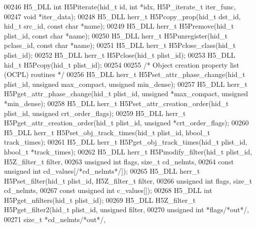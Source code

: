 \begin{DoxyCode}
00246 H5\_DLL \textcolor{keywordtype}{int} H5Piterate(hid\_t \textcolor{keywordtype}{id}, \textcolor{keywordtype}{int} *idx, H5P\_iterate\_t iter\_func,
00247             \textcolor{keywordtype}{void} *iter\_data);
00248 H5\_DLL herr\_t H5Pcopy\_prop(hid\_t dst\_id, hid\_t src\_id, \textcolor{keyword}{const} \textcolor{keywordtype}{char} *name);
00249 H5\_DLL herr\_t H5Premove(hid\_t plist\_id, \textcolor{keyword}{const} \textcolor{keywordtype}{char} *name);
00250 H5\_DLL herr\_t H5Punregister(hid\_t pclass\_id, \textcolor{keyword}{const} \textcolor{keywordtype}{char} *name);
00251 H5\_DLL herr\_t H5Pclose\_class(hid\_t plist\_id);
00252 H5\_DLL herr\_t H5Pclose(hid\_t plist\_id);
00253 H5\_DLL hid\_t H5Pcopy(hid\_t plist\_id);
00254 
00255 \textcolor{comment}{/* Object creation property list (OCPL) routines */}
00256 H5\_DLL herr\_t H5Pset\_attr\_phase\_change(hid\_t plist\_id, \textcolor{keywordtype}{unsigned} max\_compact, \textcolor{keywordtype}{unsigned} min\_dense);
00257 H5\_DLL herr\_t H5Pget\_attr\_phase\_change(hid\_t plist\_id, \textcolor{keywordtype}{unsigned} *max\_compact, \textcolor{keywordtype}{unsigned} *min\_dense);
00258 H5\_DLL herr\_t H5Pset\_attr\_creation\_order(hid\_t plist\_id, \textcolor{keywordtype}{unsigned} crt\_order\_flags);
00259 H5\_DLL herr\_t H5Pget\_attr\_creation\_order(hid\_t plist\_id, \textcolor{keywordtype}{unsigned} *crt\_order\_flags);
00260 H5\_DLL herr\_t H5Pset\_obj\_track\_times(hid\_t plist\_id, hbool\_t track\_times);
00261 H5\_DLL herr\_t H5Pget\_obj\_track\_times(hid\_t plist\_id, hbool\_t *track\_times);
00262 H5\_DLL herr\_t H5Pmodify\_filter(hid\_t plist\_id, H5Z\_filter\_t filter,
00263         \textcolor{keywordtype}{unsigned} \textcolor{keywordtype}{int} flags, \textcolor{keywordtype}{size\_t} cd\_nelmts,
00264         \textcolor{keyword}{const} \textcolor{keywordtype}{unsigned} \textcolor{keywordtype}{int} cd\_values[\textcolor{comment}{/*cd\_nelmts*/}]);
00265 H5\_DLL herr\_t H5Pset\_filter(hid\_t plist\_id, H5Z\_filter\_t filter,
00266         \textcolor{keywordtype}{unsigned} \textcolor{keywordtype}{int} flags, \textcolor{keywordtype}{size\_t} cd\_nelmts,
00267         \textcolor{keyword}{const} \textcolor{keywordtype}{unsigned} \textcolor{keywordtype}{int} c\_values[]);
00268 H5\_DLL \textcolor{keywordtype}{int} H5Pget\_nfilters(hid\_t plist\_id);
00269 H5\_DLL H5Z\_filter\_t H5Pget\_filter2(hid\_t plist\_id, \textcolor{keywordtype}{unsigned} filter,
00270        \textcolor{keywordtype}{unsigned} \textcolor{keywordtype}{int} *flags\textcolor{comment}{/*out*/},
00271        \textcolor{keywordtype}{size\_t} *cd\_nelmts\textcolor{comment}{/*out*/},

\end{DoxyCode}
